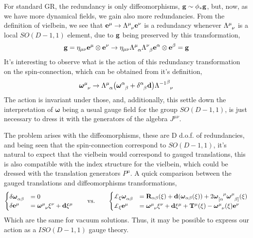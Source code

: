 \documentclass[a0,portrait]{a0poster}
\begin{document}
\begin{multicols}{2}
For standard GR, the redundancy is only diffeomorphisms, $\vb g\sim \phi_\ast \vb g$, but, now, as we have more dynamical fields, we gain 
also more redundancies. From the definition of vielbein, we see that $\vb e^\mu\rightarrow \tensor{\Lambda}{^\mu_\nu}\vb e^\nu$ is a redundancy 
whenever $\tensor{\Lambda}{^\mu_\nu}$ is a local $SO(D-1,1)$ element, due to $\vb g$ being preserved by this transformation,
\[\vb g=\eta_{\mu\nu}\vb e^\mu\otimes\vb e^\nu\rightarrow \eta_{\mu\nu}\tensor{\Lambda}{^\mu_\alpha}\tensor{\Lambda}{^\nu_\beta}\vb e^\alpha\otimes\vb e^\beta=\vb g\]
It's interesting to observe what is the action of this redundancy transformation on the spin-connection, which can be obtained from it's 
definition,
\[\tensor{{\boldsymbol\omega}}{^\mu_\nu}\rightarrow \tensor{\Lambda}{^\mu_\alpha}\qty(\tensor{{\boldsymbol\omega}}{^\alpha_\beta}+\tensor{\delta}{^\alpha_\beta}\vb d)\tensor{{\Lambda^{-1}}}{^\beta_\nu}\]
The action is invariant under those, and, additionally, this settle down the interpretation of $\boldsymbol\omega$ being a usual gauge field 
for the group $SO(D-1,1)$, is just necessary to dress it with the generators of the algebra $J^{\mu\nu}$.

The problem arises with the diffeomorphisms, these are D d.o.f. of redundancies, and being seen that the spin-connection correspond to $SO(D-1,1)$, 
it's natural to expect that the vielbein would correspond to gauged translations, this is also compatible with the index structure for the 
vielbein, which could be dressed with the translation generators $P^\mu$. A quick comparison between the gauged translations and diffeomorphisms 
transformations,
\begin{align*}
    \begin{cases}
        \delta\tensor{{\boldsymbol\omega}}{_\alpha_\beta}&=0\\
        \delta\vb e^\mu&=\tensor{{\boldsymbol\omega}}{^\mu_\nu}\xi^\nu+\vb d\xi^\mu
    \end{cases}\ \ \ \ \ \ \textnormal{vs.}\ \ \ \ \ \  \begin{cases}
        \pounds_\xi\tensor{{\boldsymbol\omega}}{_\alpha_\beta}&=\vb R_{\alpha\beta}\qty(\xi)+\vb d\qty(\boldsymbol\omega_{\alpha\beta}\qty(\xi))+2\tensor{{\boldsymbol\omega}}{_{[\alpha}^\mu}\tensor{{\boldsymbol\omega}}{^\mu_{\beta]}}\qty(\xi)\\
        \pounds_\xi\vb e^\mu&=\tensor{{\boldsymbol\omega}}{^\mu_\nu}\xi^\nu+\vb d\xi^\mu+\vb T^\mu\qty(\xi)-\tensor{{\boldsymbol\omega}}{^\mu_\nu}\qty(\xi)\vb e^\nu
    \end{cases}
\end{align*}
Which are the same for vacuum solutions. Thus, it may be possible to express our action as a $ISO(D-1,1)$ gauge theory.


\end{multicols}
\end{document}
